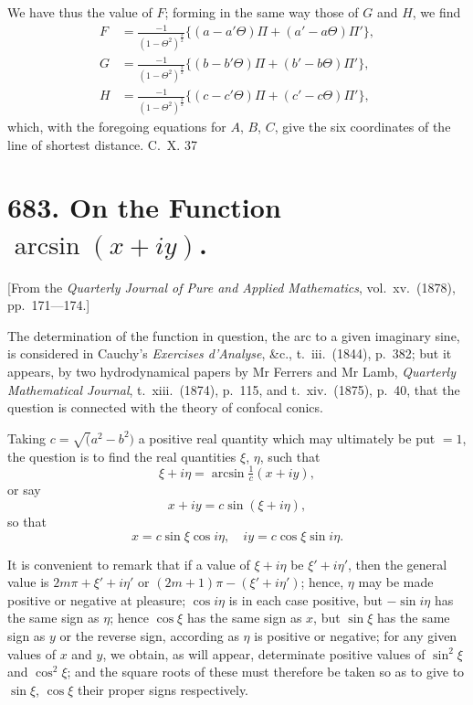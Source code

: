 \documentclass[11pt,a4paper]{book}
\begin{document}
We have thus the value of $F$; forming in the same way those of $G$ and $H$, we find
\begin{align*}
F &= \frac{-1}{(1 - \Theta^2)^{\frac{3}{2}}} \{(a - a'\Theta)\Pi + (a' - a\Theta)\Pi'\}, \\
G &= \frac{-1}{(1 - \Theta^2)^{\frac{3}{2}}} \{(b - b'\Theta)\Pi + (b' - b\Theta)\Pi'\}, \\
H &= \frac{-1}{(1 - \Theta^2)^{\frac{3}{2}}} \{(c - c'\Theta)\Pi + (c' - c\Theta)\Pi'\},
\end{align*}
which, with the foregoing equations for $A$, $B$, $C$, give the six coordinates of the line of shortest distance.
\hfill C.~X. 37

\newpage

\section*{683. On the Function $\arcsin(x + iy)$.}

[From the \textit{Quarterly Journal of Pure and Applied Mathematics}, vol.\ xv.\ (1878), pp.\ 171---174.]

The determination of the function in question, the arc to a given imaginary sine, is considered in Cauchy's \textit{Exercises d'Analyse}, \&c., t.\ iii.\ (1844), p.\ 382; but it appears, by two hydrodynamical papers by Mr Ferrers and Mr Lamb, \textit{Quarterly Mathematical Journal}, t.\ xiii.\ (1874), p.\ 115, and t.\ xiv.\ (1875), p.\ 40, that the question is connected with the theory of confocal conics.

Taking $c = \surd(a^2 - b^2)$ a positive real quantity which may ultimately be put $= 1$, the question is to find the real quantities $\xi$, $\eta$, such that
\[
\xi + i\eta = \arcsin \tfrac{1}{c}(x + iy),
\]
or say
\[
x + iy = c \sin(\xi + i\eta),
\]
so that
\[
x = c \sin \xi \cos i\eta, \quad iy = c \cos \xi \sin i\eta.
\]

It is convenient to remark that if a value of $\xi + i\eta$ be $\xi' + i\eta'$, then the general value is $2m\pi + \xi' + i\eta'$ or $(2m + 1)\pi - (\xi' + i\eta')$; hence, $\eta$ may be made positive or negative at pleasure; $\cos i\eta$ is in each case positive, but $-\sin i\eta$ has the same sign as $\eta$; hence $\cos \xi$ has the same sign as $x$, but $\sin \xi$ has the same sign as $y$ or the reverse sign, according as $\eta$ is positive or negative; for any given values of $x$ and $y$, we obtain, as will appear, determinate positive values of $\sin^2 \xi$ and $\cos^2 \xi$; and the square roots of these must therefore be taken so as to give to $\sin \xi$, $\cos \xi$ their proper signs respectively.
\end{document}
